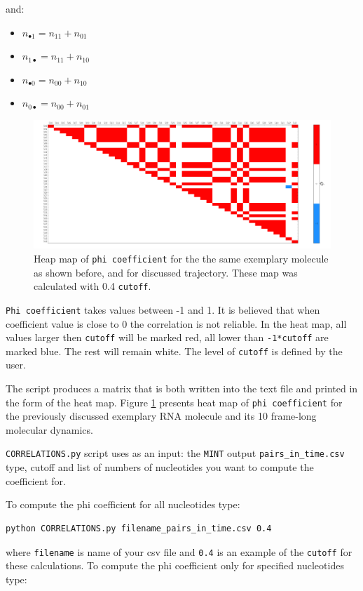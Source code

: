 \documentclass[12pt]{article}
\begin{document}
and:
\begin{itemize}
\item $n_{\bullet1} = n_{11}+n_{01}$
\item $n_{1\bullet} = n_{11}+n_{10}$
\item $n_{\bullet0} = n_{00}+n_{10}$
\item $n_{0\bullet} = n_{00}+n_{01}$
\end{itemize}

\begin{figure}[h!]
\label{coefficient}
\centering
\includegraphics[scale=0.4]{./pictures/correlation_matrix.png}
\caption{Heap map of \texttt{phi coefficient} for the the same exemplary molecule as shown before, and for discussed trajectory. These map was calculated with 0.4 \texttt{cutoff}.}
\end{figure}

\texttt{Phi coefficient} takes values between -1 and 1. It is believed that when coefficient value is close to 0 the correlation is not reliable. In the heat map, all values larger then \texttt{cutoff} will be marked red, all lower than \texttt{-1*cutoff} are marked blue. The rest will remain white. The level of \texttt{cutoff} is defined by the user.

The script produces a matrix that is both written into the text file and printed in the form of the heat map. Figure \ref{coefficient} presents heat map of \texttt{phi coefficient} for the previously discussed exemplary RNA molecule and its 10 frame-long molecular dynamics.

\texttt{CORRELATIONS.py} script uses as an input: the \texttt{MINT} output \texttt{pairs\_in\_time.csv} type, cutoff and list of numbers of nucleotides you want to compute the coefficient for.


To compute the phi coefficient for all nucleotides type:
\begin{verbatim}
python CORRELATIONS.py filename_pairs_in_time.csv 0.4
\end{verbatim}
where \texttt{filename} is name of your csv file and \texttt{0.4} is an example of the \texttt{cutoff} for these calculations.
To compute the phi coefficient only for specified nucleotides type:\\
\end{document}
